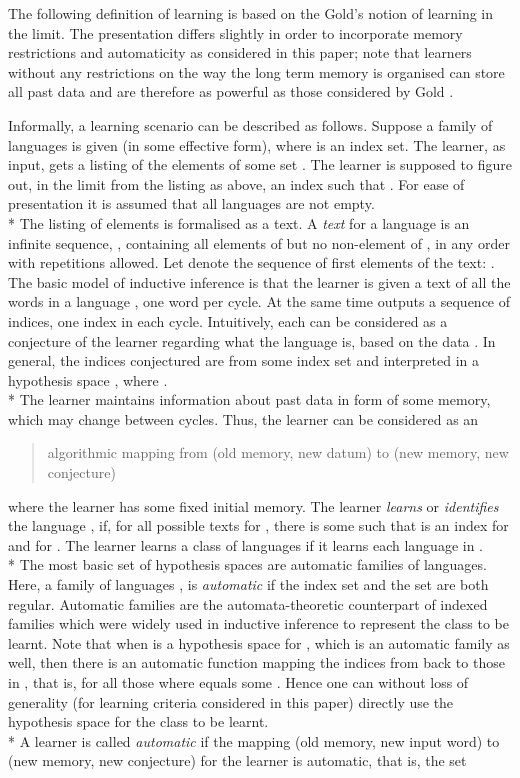 \documentclass{LMCS}
\theoremstyle{plain}\newtheorem{athm}[thm]{Theorem}
\theoremstyle{plain}\newtheorem{aprop}[thm]{Proposition}
\theoremstyle{plain}\newtheorem{aprob}[thm]{Open Problem}
\theoremstyle{plain}\newtheorem{acor}[thm]{Corollary}
\theoremstyle{plain}\newtheorem{alem}[thm]{Lemma}
\theoremstyle{definition}\newtheorem{adefn}[thm]{Definition}
\theoremstyle{definition}\newtheorem{arem}[thm]{Remark}
\theoremstyle{plain}\newtheorem{aexmp}[thm]{Example}
\theoremstyle{plain}\newtheorem{aclm}[thm]{Claim}
\def\sp{\\*\indent}
\begin{document}
\noindent
The following definition of learning is based on
the Gold's \cite{Go67} notion of learning in the limit. The presentation
differs slightly in order to incorporate memory restrictions and automaticity
as considered in this paper; note that learners without any restrictions
on the way the long term memory is organised can store all past data and
are therefore as powerful as those considered by Gold \cite{Go67}.

Informally, a learning scenario can be described as follows.
Suppose a family  of languages is given (in some effective
form), where  is an index set.
The learner, as input, gets a listing of the elements of some set .
The learner is supposed to figure out, 
in the limit from the listing as above, an index  such that . 
For ease of presentation it is assumed that all languages 
are not empty.
\sp
The listing of elements is formalised as a text.
A {\em text}  for a language  is an infinite sequence,
, containing all elements of  but no
non-element of , in any order with repetitions allowed. 
Let  denote the sequence of first  elements of the text:
.
The basic model of inductive inference \cite{An80,BB75,Go67,JORS99,OSW86}
is that the learner  is given a text 
of all the words in a language , one word per cycle.
At the same time  outputs a sequence  of indices, 
one index in each cycle. Intuitively, each  can be considered
as a conjecture of the learner regarding what the language  is,
based on the data . In general, the indices
conjectured are from some index set  and 
interpreted in a hypothesis space , where
.
\sp
The learner maintains information about past data in
form of some memory, which may change between cycles.
Thus, the learner can be considered as an
\begin{quote}
algorithmic mapping from (old memory, new datum) to
(new memory, new conjecture)
\end{quote}
where the learner has some fixed initial memory.
The learner {\em learns} or {\em identifies} the language , if,
for all possible texts for , there is some 
such that  is an index for  and
 for . The learner learns a class  of
languages if it learns each language in .
\sp
The most basic set of hypothesis spaces are
automatic families of languages. Here, a family of
languages , is {\em automatic} if the index set  and
the set  are both regular. 
Automatic families \cite{JLS09,JOPS10} are the automata-theoretic 
counterpart of indexed families \cite{An80,LZZ08} which were widely used
in inductive inference to represent the class to be learnt.
Note that when  is a hypothesis space for ,
which is an automatic family as well, then there is an automatic function 
mapping the indices from  back to those in , that is, 
for all those  where  equals some . Hence one can
without loss of generality (for learning criteria considered in
this paper) directly use the hypothesis space
 for the class  to be learnt.
\sp
A learner  is called {\em automatic}
if the mapping (old memory, new input word) to 
(new memory, new conjecture) for the learner is automatic, that is,
the set
\end{document}
